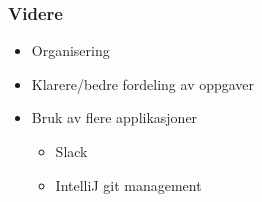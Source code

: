 \documentclass{beamer}
\begin{document}
    \begin{frame}
    \frametitle{Videre}
        \begin{itemize}
          \item Organisering
          \item Klarere/bedre fordeling av oppgaver
          \item Bruk av flere applikasjoner
          \begin{itemize}
            \item Slack
            \item IntelliJ git management
        \end{itemize}
        \end{itemize}
    \end{frame}
\end{document}
